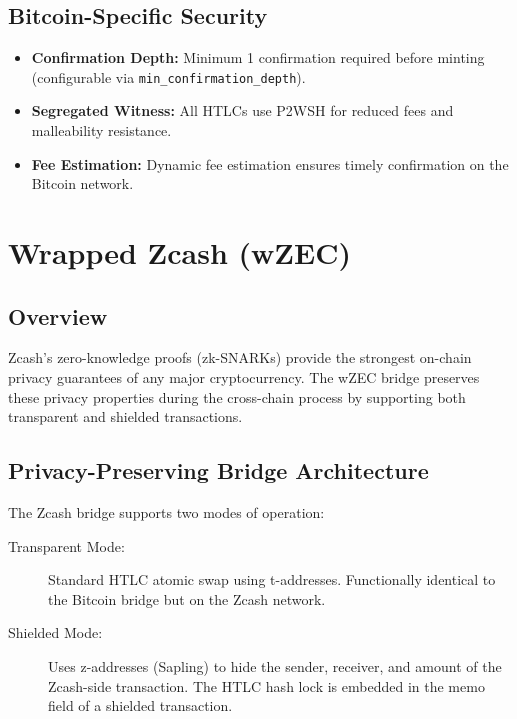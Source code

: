 \documentclass[11pt,a4paper]{article}
\begin{document}
\subsection{Bitcoin-Specific Security}

\begin{itemize}
    \item \textbf{Confirmation Depth:} Minimum 1 confirmation required before minting (configurable via \texttt{min\_confirmation\_depth}).
    \item \textbf{Segregated Witness:} All HTLCs use P2WSH for reduced fees and malleability resistance.
    \item \textbf{Fee Estimation:} Dynamic fee estimation ensures timely confirmation on the Bitcoin network.
\end{itemize}

\section{Wrapped Zcash (wZEC)}
\label{sec:wzec}

\subsection{Overview}

Zcash's zero-knowledge proofs (zk-SNARKs) provide the strongest on-chain privacy guarantees of any major cryptocurrency. The wZEC bridge preserves these privacy properties during the cross-chain process by supporting both transparent and shielded transactions.

\subsection{Privacy-Preserving Bridge Architecture}

The Zcash bridge supports two modes of operation:

\begin{description}
    \item[Transparent Mode:] Standard HTLC atomic swap using t-addresses. Functionally identical to the Bitcoin bridge but on the Zcash network.
    \item[Shielded Mode:] Uses z-addresses (Sapling) to hide the sender, receiver, and amount of the Zcash-side transaction. The HTLC hash lock is embedded in the memo field of a shielded transaction.
\end{description}
\end{document}
